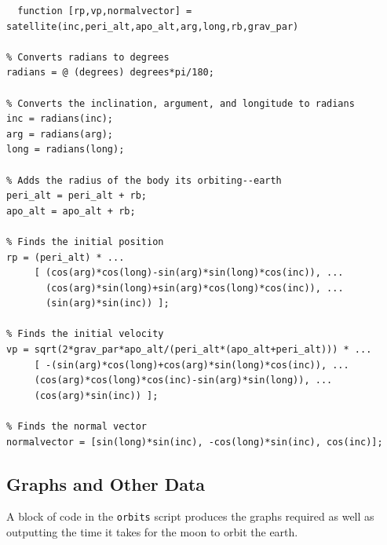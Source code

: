 \documentclass{article}
\begin{document}
\begin{verbatim}
  function [rp,vp,normalvector] =
satellite(inc,peri_alt,apo_alt,arg,long,rb,grav_par)

% Converts radians to degrees
radians = @ (degrees) degrees*pi/180;

% Converts the inclination, argument, and longitude to radians
inc = radians(inc);
arg = radians(arg);
long = radians(long);

% Adds the radius of the body its orbiting--earth
peri_alt = peri_alt + rb;
apo_alt = apo_alt + rb;

% Finds the initial position
rp = (peri_alt) * ...
     [ (cos(arg)*cos(long)-sin(arg)*sin(long)*cos(inc)), ...
       (cos(arg)*sin(long)+sin(arg)*cos(long)*cos(inc)), ...
       (sin(arg)*sin(inc)) ];

% Finds the initial velocity
vp = sqrt(2*grav_par*apo_alt/(peri_alt*(apo_alt+peri_alt))) * ...
     [ -(sin(arg)*cos(long)+cos(arg)*sin(long)*cos(inc)), ...
     (cos(arg)*cos(long)*cos(inc)-sin(arg)*sin(long)), ...
     (cos(arg)*sin(inc)) ];

% Finds the normal vector
normalvector = [sin(long)*sin(inc), -cos(long)*sin(inc), cos(inc)];
\end{verbatim}

\subsection{Graphs and Other Data}

A block of code in the \verb[orbits[ script produces the graphs
required as well as outputting the time it takes for the moon to orbit
the earth.
\end{document}
